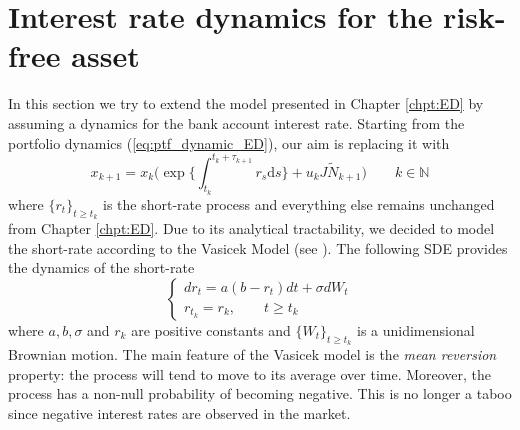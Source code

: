 \section{Interest rate dynamics for the risk-free asset}\label{sec:Interest_rate_dynamics}
In this section we try to extend the model presented in Chapter \ref{chpt:ED} by assuming a dynamics for the bank account interest rate. Starting from the portfolio dynamics (\ref{eq:ptf_dynamic_ED}), our aim is replacing it with
\begin{equation}\label{eq:portfolio_dynamic_Vasicek}
\boxed{x_{k+1} = x_k\Big( \exp\Big\{\int_{t_k}^{t_k+\tau_{k+1}}\!\!\!\!\!\!\!\!r_s\mathrm{d}s \Big\} + u_kJ\widetilde{N}_{k+1}\Big)} \qquad k \in \mathbb{N}
\end{equation}
where $\{r_t\}_{t\geq t_k}$ is the short-rate process and everything else remains unchanged from Chapter \ref{chpt:ED}. Due to its analytical tractability, we decided to model the short-rate according to the Vasicek Model (see \cite{brigo2007}). The following \gls{SDE} provides the dynamics of the short-rate
\begin{equation}\label{eq:VasicekSDE}
\begin{cases*}
dr_t = a(b-r_t)dt + \sigma dW_t\\
r_{t_k} = r_k, \qquad t \geq t_k
\end{cases*}
\end{equation}
where $a,b,\sigma$ and $r_k$ are positive constants and $\{W_t\}_{t\geq t_k}$ is a unidimensional Brownian motion. The main feature of the Vasicek model is the \textit{mean reversion} property: the process will tend to move to its average over time. Moreover, the process has a non-null probability of becoming negative. This is no longer a taboo since negative interest rates are observed in the market.

